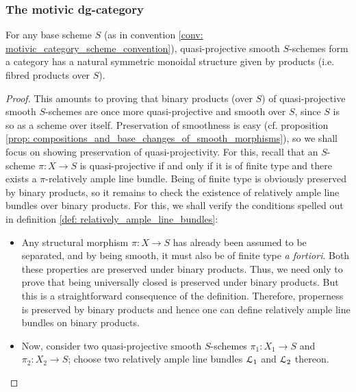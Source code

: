             \subsubsection{The motivic dg-category}
                \begin{claim}
                    For any base scheme $S$ (as in convention \ref{conv: motivic_category_scheme_convention}), quasi-projective smooth $S$-schemes form a category has a natural symmetric monoidal structure given by products (i.e. fibred products over $S$).
                \end{claim}
                    \begin{proof}
                        This amounts to proving that binary products (over $S$) of quasi-projective smooth $S$-schemes are once more quasi-projective and smooth over $S$, since $S$ is so as a scheme over itself. Preservation of smoothness is easy (cf. proposition \ref{prop: compositions_and_base_changes_of_smooth_morphisms}), so we shall focus on showing preservation of quasi-projectivity. For this, recall that an $S$-scheme $\pi: X \to S$ is quasi-projective if and only if it is of finite type and there exists a $\pi$-relatively ample line bundle. Being of finite type is obviously preserved by binary products, so it remains to check the existence of relatively ample line bundles over binary products. For this, we shall verify the conditions spelled out in definition \ref{def: relatively_ample_line_bundles}:
                            \begin{itemize}
                                \item Any structural morphism $\pi: X \to S$ has already been assumed to be separated, and by being smooth, it must also be of finite type \textit{a fortiori}. Both these properties are preserved under binary products. Thus, we need only to prove that being universally closed is preserved under binary products. But this is a straightforward consequence of the definition. Therefore, properness is preserved by binary products and hence one can define relatively ample line bundles on binary products.
                                \item Now, consider two quasi-projective smooth $S$-schemes $\pi_1: X_1 \to S$ and $\pi_2: X_2 \to S$; choose two relatively ample line bundles $\mathcal{L}_1$ and $\mathcal{L}_2$ thereon. 
                            \end{itemize}
                    \end{proof}
            
